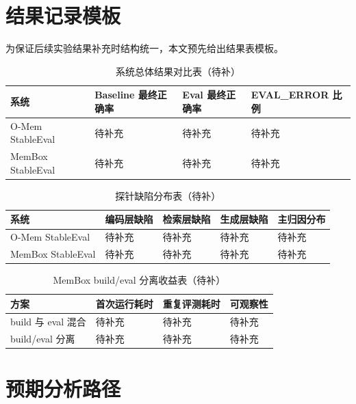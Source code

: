 \section{结果记录模板}

为保证后续实验结果补充时结构统一，本文预先给出结果表模板。

\begin{table}[htbp]
\centering
\caption{系统总体结果对比表（待补）}
\label{tab:overall-result}
\begin{tabular}{p{}p{}p{}p{}}
\toprule
系统 & Baseline 最终正确率 & Eval 最终正确率 & EVAL\_ERROR 比例 \\
\midrule
O-Mem StableEval & 待补充 & 待补充 & 待补充 \\
MemBox StableEval & 待补充 & 待补充 & 待补充 \\
\bottomrule
\end{tabular}
\end{table}

\begin{table}[htbp]
\centering
\caption{探针缺陷分布表（待补）}
\label{tab:defect-result}
\begin{tabular}{p{}p{}p{}p{}p{}}
\toprule
系统 & 编码层缺陷 & 检索层缺陷 & 生成层缺陷 & 主归因分布 \\
\midrule
O-Mem StableEval & 待补充 & 待补充 & 待补充 & 待补充 \\
MemBox StableEval & 待补充 & 待补充 & 待补充 & 待补充 \\
\bottomrule
\end{tabular}
\end{table}

\begin{table}[htbp]
\centering
\caption{MemBox build/eval 分离收益表（待补）}
\label{tab:membox-benefit}
\begin{tabular}{p{}p{}p{}p{}}
\toprule
方案 & 首次运行耗时 & 重复评测耗时 & 可观察性 \\
\midrule
build 与 eval 混合 & 待补充 & 待补充 & 待补充 \\
build/eval 分离 & 待补充 & 待补充 & 待补充 \\
\bottomrule
\end{tabular}
\end{table}

\section{预期分析路径}

